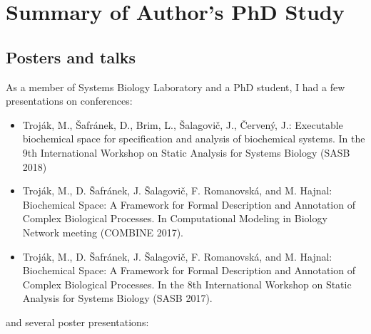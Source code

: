 \documentclass[11pt,a4paper]{report}
\newcounter{counter}[section]
\begin{document}
\newpage
{}





\appendix

\chapter{Summary of Author’s PhD Study}

\section{Posters and talks}

As a member of Systems Biology Laboratory and a PhD student, I had a few presentations on conferences:

\begin{itemize}
 \item Troják, M., Šafránek, D., Brim, L., Šalagovič, J., Červený, J.: Executable biochemical space for specification and analysis of biochemical systems. In the 9th International Workshop on Static Analysis for Systems Biology (SASB 2018)
 \item Troják, M., D. Šafránek, J. Šalagovič, F. Romanovská, and M. Hajnal: Biochemical Space: A Framework for Formal Description and Annotation of Complex Biological Processes. In Computational Modeling in Biology Network meeting (COMBINE 2017).
 \item Troják, M., D. Šafránek, J. Šalagovič, F. Romanovská, and M. Hajnal: Biochemical Space: A Framework for Formal Description and Annotation of Complex Biological Processes. In the 8th International Workshop on Static Analysis for Systems Biology (SASB 2017).
\end{itemize}

\noindent and several poster presentations:
\end{document}

